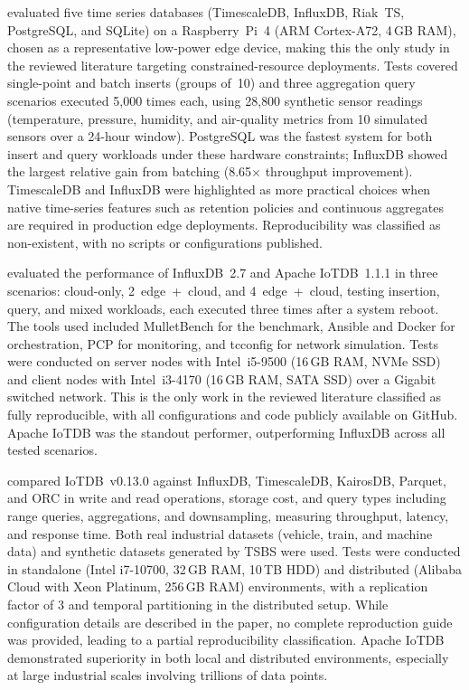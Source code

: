 \cite{grzesik2020comparative} evaluated five time series databases (TimescaleDB, InfluxDB,
Riak~TS, PostgreSQL, and SQLite) on a Raspberry~Pi~4 (ARM Cortex-A72, 4\,GB RAM), chosen
as a representative low-power edge device, making this the only study in the reviewed
literature targeting constrained-resource deployments. Tests covered single-point and batch
inserts (groups of~10) and three aggregation query scenarios executed 5{,}000 times each,
using 28{,}800 synthetic sensor readings (temperature, pressure, humidity, and air-quality
metrics from 10 simulated sensors over a 24-hour window). PostgreSQL was the fastest system
for both insert and query workloads under these hardware constraints; InfluxDB showed the
largest relative gain from batching (8.65$\times$ throughput improvement). TimescaleDB and
InfluxDB were highlighted as more practical choices when native time-series features such as
retention policies and continuous aggregates are required in production edge deployments.
Reproducibility was classified as non-existent, with no scripts or configurations published.

\cite{pereira2023mulletbench} evaluated the performance of InfluxDB~2.7 and Apache IoTDB~1.1.1
in three scenarios: cloud-only, 2~edge~+~cloud, and 4~edge~+~cloud, testing insertion,
query, and mixed workloads, each executed three times after a system reboot. The tools used
included MulletBench for the benchmark, Ansible and Docker for orchestration, PCP for
monitoring, and tcconfig for network simulation. Tests were conducted on server nodes with
Intel~i5-9500 (16\,GB RAM, NVMe SSD) and client nodes with Intel~i3-4170 (16\,GB RAM,
SATA SSD) over a Gigabit switched network. This is the only work in the reviewed literature
classified as fully reproducible, with all configurations and code publicly available on GitHub.
Apache IoTDB was the standout performer, outperforming InfluxDB across all tested scenarios.

\cite{wang2023iotdb} compared IoTDB~v0.13.0 against InfluxDB, TimescaleDB, KairosDB, Parquet,
and ORC in write and read operations, storage cost, and query types including range queries,
aggregations, and downsampling, measuring throughput, latency, and response time.
Both real industrial datasets (vehicle, train, and machine data) and synthetic datasets
generated by TSBS were used. Tests were conducted in standalone (Intel i7-10700, 32\,GB RAM,
10\,TB HDD) and distributed (Alibaba Cloud with Xeon Platinum, 256\,GB RAM) environments,
with a replication factor of 3 and temporal partitioning in the distributed setup. While
configuration details are described in the paper, no complete reproduction guide was provided,
leading to a partial reproducibility classification. Apache IoTDB demonstrated superiority
in both local and distributed environments, especially at large industrial scales involving
trillions of data points.

